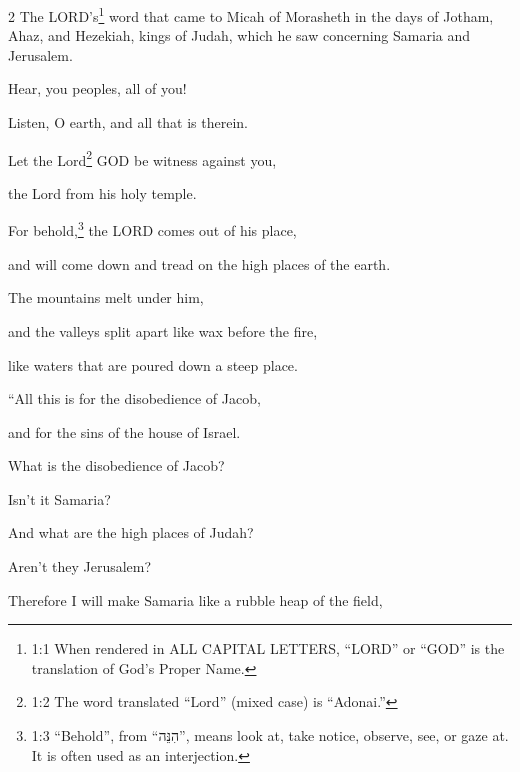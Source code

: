 




\vspace{-1.36in}
\begin{multicols}{2}
\mychapter{} \myverse*{}The LORD’s\footnote{1:1 When rendered in ALL CAPITAL LETTERS, “LORD” or “GOD” is the translation of God’s Proper Name.}
word that came to Micah of Morasheth in the days of Jotham, Ahaz, and Hezekiah, kings of Judah, which
he saw concerning Samaria and Jerusalem.

\myverse{}Hear, you peoples, all of you!

Listen, O earth, and all that is therein.

Let the Lord\footnote{1:2 The word translated “Lord” (mixed case) is “Adonai.”} GOD be witness against you,

the Lord from his holy temple.

\myverse{}For behold,\footnote{1:3 “Behold”, from “הִנֵּה”, means look at, take notice, observe, see, or gaze at. It is
	often used as an interjection.} the LORD comes out of his place,

and will come down and tread on the high places of the earth.

\myverse{}The mountains melt under him,

and the valleys split apart like wax before the fire,

like waters that are poured down a steep place.


\vspace{\baselineskip} \myverse{}“All this is for the disobedience of Jacob,

and for the sins of the house of Israel.

What is the disobedience of Jacob?

Isn’t it Samaria?

And what are the high places of Judah?

Aren’t they Jerusalem?

\myverse{}Therefore I will make Samaria like a rubble heap of the field,


\end{multicols}
